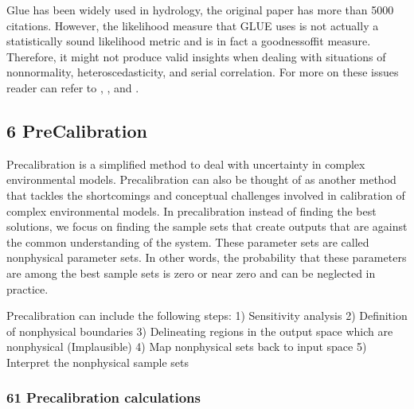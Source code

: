 \documentclass[letterpaper,10pt,english]{book}
\begin{document}
\sphinxAtStartPar
Glue has been widely used in hydrology, the original paper has more than
5000 citations. However, the likelihood measure that GLUE uses is not
actually a statistically sound likelihood metric and is in fact a
goodness\sphinxhyphen{}of\sphinxhyphen{}fit measure. Therefore, it might not produce valid insights
when dealing with situations of non\sphinxhyphen{}normality, heteroscedasticity, and
serial correlation. For more on these issues reader can refer to
,
,
and .


\subsection{6\sphinxhyphen{} Pre\sphinxhyphen{}Calibration}
\label{\detokenize{A2_Jupyter_Notebooks:pre-calibration}}
\sphinxAtStartPar
Pre\sphinxhyphen{}calibration 
is a simplified method to deal with uncertainty in complex environmental
models. Pre\sphinxhyphen{}calibration can also be thought of as another method that
tackles the shortcomings and conceptual challenges involved in
calibration of complex environmental models. In pre\sphinxhyphen{}calibration instead
of finding the best solutions, we focus on finding the sample sets that
create outputs that are against the common understanding of the system.
These parameter sets are called non\sphinxhyphen{}physical parameter sets. In other
words, the probability that these parameters are among the best sample
sets is zero or near zero and can be neglected in practice.

\sphinxAtStartPar
Pre\sphinxhyphen{}calibration can include the following steps: 1) Sensitivity analysis
2) Definition of non\sphinxhyphen{}physical boundaries 3) Delineating regions in the
output space which are non\sphinxhyphen{}physical (Implausible) 4) Map non\sphinxhyphen{}physical
sets back to input space 5) Interpret the non\sphinxhyphen{}physical sample sets


\subsubsection{6\sphinxhyphen{}1 Pre\sphinxhyphen{}calibration calculations}
\label{\detokenize{A2_Jupyter_Notebooks:pre-calibration-calculations}}
\end{document}
